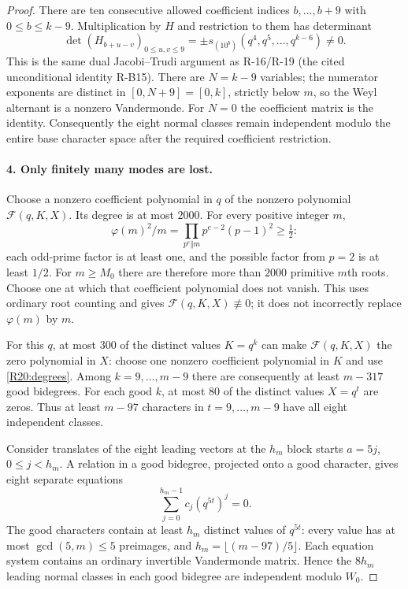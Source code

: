 \documentclass[11pt,a4paper]{article}
\theoremstyle{definition}\newtheorem{definition}{Definition}
\begin{document}
\begin{proof}
There are ten consecutive allowed coefficient indices
$b,\ldots,b+9$ with $0\leq b\leq k-9$.
Multiplication by $H$ and restriction to them has determinant
\[
 \det(H_{b+u-v})_{0\leq u,v\leq9}
 =\pm s_{(10^b)}(q^4,q^5,\ldots,q^{k-6})\ne0.
\]
This is the same dual Jacobi--Trudi argument as R-16/R-19
(the cited unconditional identity R-B15). There are $N=k-9$
variables; the numerator exponents are distinct in $[0,N+9]=[0,k]$,
strictly below $m$, so the Weyl alternant is a nonzero Vandermonde.
For $N=0$ the coefficient matrix is the identity.
Consequently the eight normal classes remain independent modulo
the entire base character space after the required coefficient
restriction.

\paragraph{4. Only finitely many modes are lost.}
Choose a nonzero coefficient polynomial in $q$ of the nonzero
polynomial $\mathscr F(q,K,X)$. Its degree is at most $2000$.
For every positive integer $m$,
\[
 \varphi(m)^2/m
 =\prod_{p^e\Vert m}p^{e-2}(p-1)^2\geq\tfrac12:
\]
each odd-prime factor is at least one, and the possible factor
from $p=2$ is at least $1/2$.
For $m\geq M_0$ there are therefore more than $2000$ primitive
$m$th roots. Choose one at which that coefficient polynomial does
not vanish. This uses ordinary root counting and gives
$\mathscr F(q,K,X)\not\equiv0$; it does not incorrectly replace
$\varphi(m)$ by $m$.

For this $q$, at most $300$ of the distinct values $K=q^k$ can
make $\mathscr F(q,K,X)$ the zero polynomial in $X$: choose one
nonzero coefficient polynomial in $K$ and use
\eqref{R20:degrees}. Among $k=9,\ldots,m-9$ there are consequently
at least $m-317$ good bidegrees. For each good $k$, at most $80$
of the distinct values $X=q^t$ are zeros. Thus at least $m-97$
characters in $t=9,\ldots,m-9$ have all eight independent classes.

Consider translates of the eight leading vectors at the $h_m$
block starts $a=5j$, $0\leq j<h_m$. A relation in a good bidegree,
projected onto a good character, gives eight separate equations
\[
 \sum_{j=0}^{h_m-1}c_j(q^{5t})^j=0.
\]
The good characters contain at least $h_m$ distinct values of
$q^{5t}$: every value has at most $\gcd(5,m)\leq5$ preimages,
and $h_m=\lfloor(m-97)/5\rfloor$.
Each equation system contains an ordinary invertible Vandermonde
matrix. Hence the $8h_m$ leading normal classes in each good
bidegree are independent modulo $W_0$.


\end{proof}
\end{document}
